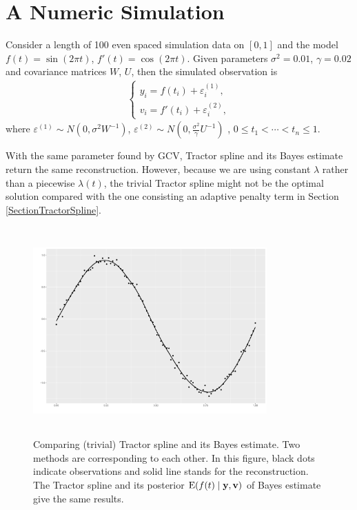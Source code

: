 \section{A Numeric Simulation}

Consider a length of 100 even spaced simulation data on $[0,1]$ and the model $f(t)=\sin(2\pi t)$, $f'(t)=\cos(2\pi t)$. Given parameters $\sigma^2=0.01$, $\gamma=0.02$ and covariance matrices $W$, $U$, then the simulated observation is 
\begin{align}
\begin{cases}
y_i =f(t_i)+\varepsilon_{i}^{(1)}, \\
v_i =f'(t_i)+\varepsilon_{i}^{(2)}, 
\end{cases}
\end{align}
where $\varepsilon^{(1)}\sim N\left(0,\sigma^2W^{-1}\right)$, $\varepsilon^{(2)}\sim N\left(0,\frac{\sigma^2}{\gamma}U^{-1}\right)$ , $0\leq t_1 < \cdots < t_n \leq 1$. 

With the same parameter found by GCV, Tractor spline and its Bayes estimate return the same reconstruction. However, because we are using constant $\lambda$ rather than a piecewise $\lambda(t)$, the trivial Tractor spline might not be the optimal solution compared with the one consisting an adaptive penalty term in Section \ref{SectionTractorSpline}. 

\begin{figure}[h]
\centering
\includegraphics[width=0.8\textwidth,height=8cm]{Chapters/03GPR/plot/ggsim_cov} 
 \caption{Comparing (trivial) Tractor spline and its Bayes estimate. Two methods are corresponding to each other. In this figure, black dots indicate observations and solid line stands for the reconstruction. The Tractor spline and its posterior $\mathrm{E}(f(t) \mid \mathbf{y}, \mathbf{v})$ of Bayes estimate give the same results. }
\end{figure}



